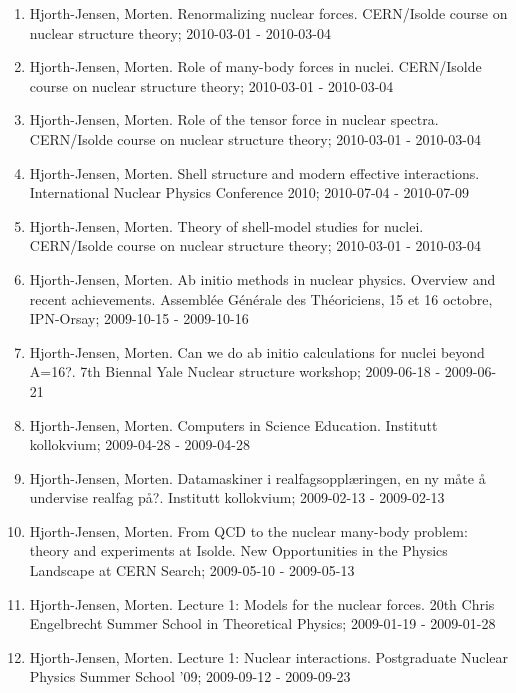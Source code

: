 \documentclass[a4wide,10pt]{article}
\begin{document}
\begin{enumerate}
\item Hjorth-Jensen, Morten.  Renormalizing nuclear forces. CERN/Isolde course on nuclear structure theory; 2010-03-01 - 2010-03-04

\item Hjorth-Jensen, Morten.  Role of many-body forces in nuclei. CERN/Isolde course on nuclear structure theory; 2010-03-01 - 2010-03-04

\item Hjorth-Jensen, Morten.  Role of the tensor force in nuclear spectra. CERN/Isolde course on nuclear structure theory; 2010-03-01 - 2010-03-04

\item Hjorth-Jensen, Morten.  Shell structure and modern effective interactions. International Nuclear Physics Conference 2010; 2010-07-04 - 2010-07-09

\item Hjorth-Jensen, Morten.  Theory of shell-model studies for nuclei. CERN/Isolde course on nuclear structure theory; 2010-03-01 - 2010-03-04

\item Hjorth-Jensen, Morten.  Ab initio methods in nuclear physics. Overview and recent achievements. Assemblée Générale des Théoriciens, 15 et 16 octobre, IPN-Orsay; 2009-10-15 - 2009-10-16

\item Hjorth-Jensen, Morten.  Can we do ab initio calculations for nuclei beyond A=16?. 7th Biennal Yale Nuclear structure workshop; 2009-06-18 - 2009-06-21

\item Hjorth-Jensen, Morten.  Computers in Science Education. Institutt kollokvium; 2009-04-28 - 2009-04-28

\item Hjorth-Jensen, Morten.  Datamaskiner i realfagsopplæringen, en ny måte å undervise realfag på?. Institutt kollokvium; 2009-02-13 - 2009-02-13

\item Hjorth-Jensen, Morten.  From QCD to the nuclear many-body problem: theory and experiments at Isolde. New Opportunities in the Physics Landscape at CERN Search; 2009-05-10 - 2009-05-13

\item Hjorth-Jensen, Morten.  Lecture 1: Models for the nuclear forces. 20th Chris Engelbrecht Summer School in Theoretical Physics; 2009-01-19 - 2009-01-28

\item Hjorth-Jensen, Morten.  Lecture 1: Nuclear interactions. Postgraduate Nuclear Physics Summer School '09; 2009-09-12 - 2009-09-23


\end{enumerate}
\end{document}
